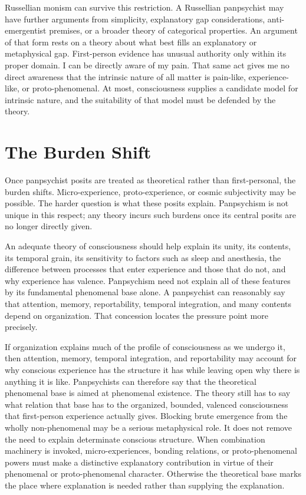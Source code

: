 Russellian monism can survive this restriction. A Russellian panpsychist may have further arguments from simplicity, explanatory gap considerations, anti-emergentist premises, or a broader theory of categorical properties. An argument of that form rests on a theory about what best fills an explanatory or metaphysical gap. First-person evidence has unusual authority only within its proper domain. I can be directly aware of my pain. That same act gives me no direct awareness that the intrinsic nature of all matter is pain-like, experience-like, or proto-phenomenal. At most, consciousness supplies a candidate model for intrinsic nature, and the suitability of that model must be defended by the theory.

\section{The Burden Shift}

Once panpsychist posits are treated as theoretical rather than first-personal, the burden shifts. Micro-experience, proto-experience, or cosmic subjectivity may be possible. The harder question is what these posits explain. Panpsychism is not unique in this respect; any theory incurs such burdens once its central posits are no longer directly given.

An adequate theory of consciousness should help explain its unity, its contents, its temporal grain, its sensitivity to factors such as sleep and anesthesia, the difference between processes that enter experience and those that do not, and why experience has valence. Panpsychism need not explain all of these features by its fundamental phenomenal base alone. A panpsychist can reasonably say that attention, memory, reportability, temporal integration, and many contents depend on organization. That concession locates the pressure point more precisely.

If organization explains much of the profile of consciousness as we undergo it, then attention, memory, temporal integration, and reportability may account for why conscious experience has the structure it has while leaving open why there is anything it is like. Panpsychists can therefore say that the theoretical phenomenal base is aimed at phenomenal existence. The theory still has to say what relation that base has to the organized, bounded, valenced consciousness that first-person experience actually gives. Blocking brute emergence from the wholly non-phenomenal may be a serious metaphysical role. It does not remove the need to explain determinate conscious structure. When combination machinery is invoked, micro-experiences, bonding relations, or proto-phenomenal powers must make a distinctive explanatory contribution in virtue of their phenomenal or proto-phenomenal character. Otherwise the theoretical base marks the place where explanation is needed rather than supplying the explanation.

